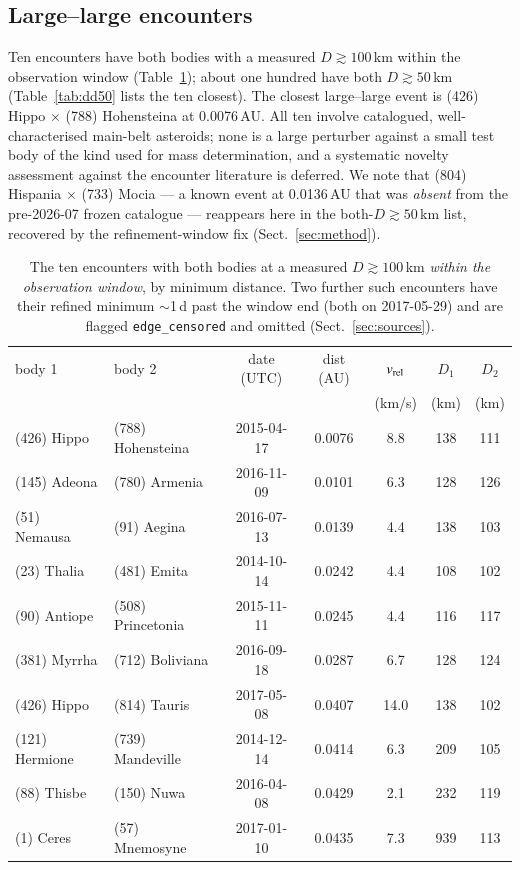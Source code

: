 \documentclass{aa}
\begin{document}
\subsection{Large--large encounters}
\label{sec:largelarge}

Ten encounters have both bodies with a measured $D\gtrsim100$\,km within the
observation window (Table~\ref{tab:dd100}); about one hundred have both
$D\gtrsim50$\,km (Table~\ref{tab:dd50} lists the ten closest). The closest
large--large event is
(426) Hippo $\times$ (788) Hohensteina at 0.0076\,AU. All ten involve
catalogued, well-characterised main-belt asteroids; none is a large perturber
against a small test body of the kind used for mass determination, and a
systematic novelty assessment against the encounter literature is deferred. We
note that (804) Hispania $\times$ (733) Mocia --- a known event
\citep{fienga2003} at 0.0136\,AU that was \emph{absent} from the pre-2026-07
frozen catalogue --- reappears here in the both-$D\gtrsim50$\,km list, recovered
by the refinement-window fix (Sect.~\ref{sec:method}).

\begin{table}
\caption{The ten encounters with both bodies at a measured
$D\gtrsim100$\,km \emph{within the observation window}, by minimum distance. Two
further such encounters have their refined minimum $\sim$1\,d past the window end
(both on 2017-05-29) and are flagged \texttt{edge\_censored} and omitted
(Sect.~\ref{sec:sources}).}
\label{tab:dd100}
\centering
\small
\begin{tabular}{llccccc}
\hline\hline
body 1 & body 2 & date (UTC) & dist (AU) & $v_{\rm rel}$ & $D_1$ & $D_2$ \\
       &        &            &           & (km/s)        & (km)  & (km)  \\
\hline
(426) Hippo     & (788) Hohensteina  & 2015-04-17 & 0.0076 & 8.8  & 138 & 111 \\
(145) Adeona    & (780) Armenia      & 2016-11-09 & 0.0101 & 6.3  & 128 & 126 \\
(51) Nemausa    & (91) Aegina        & 2016-07-13 & 0.0139 & 4.4  & 138 & 103 \\
(23) Thalia     & (481) Emita        & 2014-10-14 & 0.0242 & 4.4  & 108 & 102 \\
(90) Antiope    & (508) Princetonia  & 2015-11-11 & 0.0245 & 4.4  & 116 & 117 \\
(381) Myrrha    & (712) Boliviana    & 2016-09-18 & 0.0287 & 6.7  & 128 & 124 \\
(426) Hippo     & (814) Tauris       & 2017-05-08 & 0.0407 & 14.0 & 138 & 102 \\
(121) Hermione  & (739) Mandeville   & 2014-12-14 & 0.0414 & 6.3  & 209 & 105 \\
(88) Thisbe     & (150) Nuwa         & 2016-04-08 & 0.0429 & 2.1  & 232 & 119 \\
(1) Ceres       & (57) Mnemosyne     & 2017-01-10 & 0.0435 & 7.3  & 939 & 113 \\
\hline
\end{tabular}
\end{table}
\end{document}
